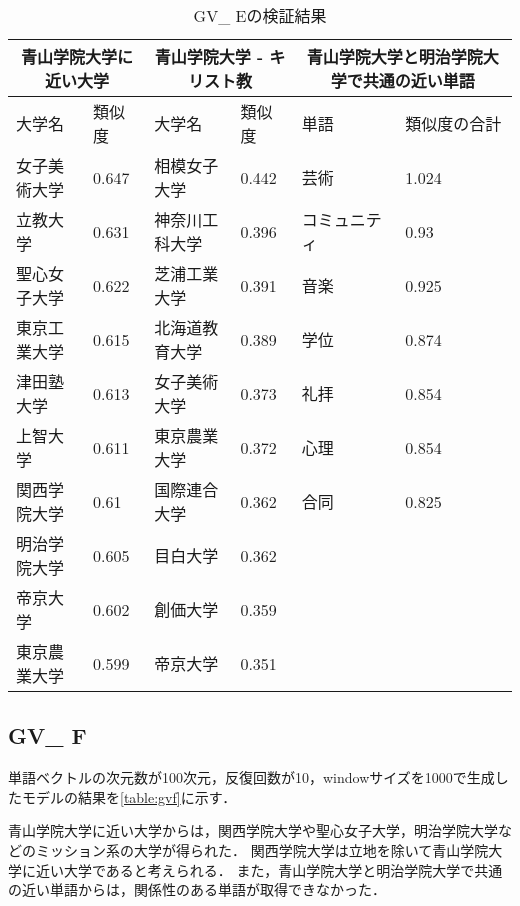 \begin{table}[H]
\caption{GV\_ Eの検証結果}
\centering
\footnotesize
\begin{tabular}{ll|ll|ll}
\hline
\multicolumn{2}{c}{青山学院大学に近い大学} & \multicolumn{2}{c}{青山学院大学 - キリスト教} & \multicolumn{2}{c}{青山学院大学と明治学院大学で共通の近い単語}
\\ \hline
大学名 & 類似度 & 大学名 & 類似度 & 単語 & 類似度の合計
\\ \hline \hline
女子美術大学 & 0.647 & 相模女子大学 & 0.442 & 芸術 & 1.024\\
立教大学 & 0.631 & 神奈川工科大学 & 0.396 & コミュニティ & 0.93\\
聖心女子大学 & 0.622 & 芝浦工業大学 & 0.391 & 音楽 & 0.925\\
東京工業大学 & 0.615 & 北海道教育大学 & 0.389 & 学位 & 0.874\\
津田塾大学 & 0.613 & 女子美術大学 & 0.373 & 礼拝 & 0.854\\
上智大学 & 0.611 & 東京農業大学 & 0.372 & 心理 & 0.854\\
関西学院大学 & 0.61 & 国際連合大学 & 0.362 & 合同 & 0.825\\
明治学院大学 & 0.605 & 目白大学 & 0.362 & & \\
帝京大学 & 0.602 & 創価大学 & 0.359 & & \\
東京農業大学 & 0.599 & 帝京大学 & 0.351 & & \\ \hline
\end{tabular}
\label{table:gve}
\end{table}

\subsection{GV\_ F}
単語ベクトルの次元数が100次元，反復回数が10，windowサイズを1000で生成したモデルの結果を\ref{table:gvf}に示す．

青山学院大学に近い大学からは，関西学院大学や聖心女子大学，明治学院大学などのミッション系の大学が得られた．
関西学院大学は立地を除いて青山学院大学に近い大学であると考えられる．
また，青山学院大学と明治学院大学で共通の近い単語からは，関係性のある単語が取得できなかった．

